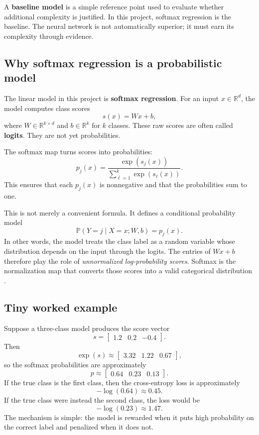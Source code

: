 \documentclass[11pt]{article}
\begin{document}
A \textbf{baseline model} is a simple reference point used to evaluate whether additional complexity is justified. In this project, softmax regression is the baseline. The neural network is not automatically superior; it must earn its complexity through evidence.

\subsection{Why softmax regression is a probabilistic model}

The linear model in this project is \textbf{softmax regression}. For an input $x \in \mathbb{R}^d$, the model computes class scores
\[
s(x) = Wx + b,
\]
where $W \in \mathbb{R}^{k \times d}$ and $b \in \mathbb{R}^k$ for $k$ classes. These raw scores are often called \textbf{logits}. They are not yet probabilities.

The softmax map turns scores into probabilities:
\[
p_j(x) = \frac{\exp(s_j(x))}{\sum_{\ell=1}^k \exp(s_\ell(x))}.
\]
This ensures that each $p_j(x)$ is nonnegative and that the probabilities sum to one.

This is not merely a convenient formula. It defines a conditional probability model
\[
\mathbb{P}(Y=j \mid X=x;W,b)=p_j(x).
\]
In other words, the model treats the class label as a random variable whose distribution depends on the input through the logits. The entries of $Wx+b$ therefore play the role of \emph{unnormalized log-probability scores}. Softmax is the normalization map that converts those scores into a valid categorical distribution \cite{murphy2022,ngdeep}.

\subsection{Tiny worked example}

Suppose a three-class model produces the score vector
\[
s = \begin{bmatrix}1.2 & 0.2 & -0.4\end{bmatrix}.
\]
Then
\[
\exp(s) \approx \begin{bmatrix}3.32 & 1.22 & 0.67\end{bmatrix},
\]
so the softmax probabilities are approximately
\[
p \approx \begin{bmatrix}0.64 & 0.23 & 0.13\end{bmatrix}.
\]
If the true class is the first class, then the cross-entropy loss is approximately
\[
-\log(0.64) \approx 0.45.
\]
If the true class were instead the second class, the loss would be
\[
-\log(0.23) \approx 1.47.
\]
The mechanism is simple: the model is rewarded when it puts high probability on the correct label and penalized when it does not.
\end{document}
